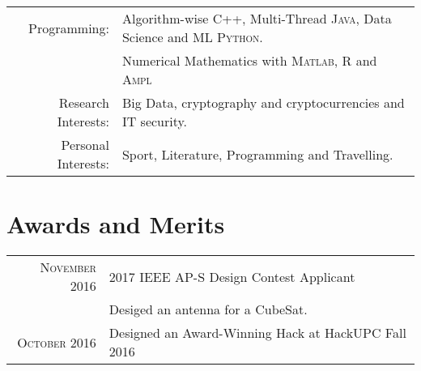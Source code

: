 \documentclass[a4paper,10pt]{article} %
\begin{document}
\begin{tabular}{rl}
Programming:  & Algorithm-wise \textsc{C++}, Multi-Thread \textsc{Java}, Data Science and ML \textsc{Python}. \\
 &  Numerical Mathematics with \textsc{Matlab}, \textsc{R} and \textsc{Ampl} \\
 Research Interests: & Big Data, cryptography and cryptocurrencies and IT security. \\
Personal Interests: & Sport, Literature, Programming and Travelling.
\end{tabular}


\section{Awards and Merits}
\begin{tabular}{rl}
\textsc{November} 2016 & 2017 IEEE AP-S Design Contest Applicant \\
 & Desiged an antenna for a CubeSat. \\
\textsc{October} 2016 & Designed an Award-Winning Hack at HackUPC Fall 2016
\end{tabular}

%
%
%	
\end{document}
